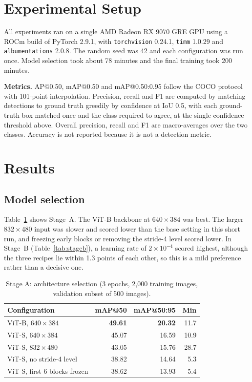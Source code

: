 \documentclass[conference]{IEEEtran}
\begin{document}
\section{Experimental Setup}
All experiments ran on a single AMD Radeon RX 9070 GRE GPU using a ROCm build of PyTorch 2.9.1, with \texttt{torchvision} 0.24.1, \texttt{timm} 1.0.29 and \texttt{albumentations} 2.0.8. The random seed was 42 and each configuration was run once. Model selection took about 78 minutes and the final training took 200 minutes.

\textbf{Metrics.} AP@0.50, mAP@0.50 and mAP@0.50:0.95 follow the COCO protocol~\cite{lin2014coco} with 101-point interpolation. Precision, recall and F1 are computed by matching detections to ground truth greedily by confidence at IoU 0.5, with each ground-truth box matched once and the class required to agree, at the single confidence threshold above. Overall precision, recall and F1 are macro-averages over the two classes. Accuracy is not reported because it is not a detection metric.

\section{Results}
\subsection{Model selection}
Table~\ref{tab:stagea} shows Stage~A. The ViT-B backbone at $640\times384$ was best. The larger $832\times480$ input was slower and scored lower than the base setting in this short run, and freezing early blocks or removing the stride-4 level scored lower. In Stage~B (Table~\ref{tab:stageb}), a learning rate of $2\times10^{-4}$ scored highest, although the three recipes lie within 1.3 points of each other, so this is a mild preference rather than a decisive one.

\begin{table}[t]
\centering
\caption{Stage A: architecture selection (3 epochs, 2{,}000 training images, validation subset of 500 images).}
\label{tab:stagea}
\begin{tabular}{lrrr}
\toprule
Configuration & mAP@50 & mAP@50:95 & Min \\
\midrule
ViT-B, $640\times384$ & \textbf{49.61} & \textbf{20.32} & 11.7 \\
ViT-S, $640\times384$ & 45.07 & 16.59 & 10.9 \\
ViT-S, $832\times480$ & 43.05 & 15.76 & 28.7 \\
ViT-S, no stride-4 level & 38.82 & 14.64 & 5.3 \\
ViT-S, first 6 blocks frozen & 38.62 & 13.93 & 5.4 \\
\bottomrule
\end{tabular}
\end{table}
\end{document}
